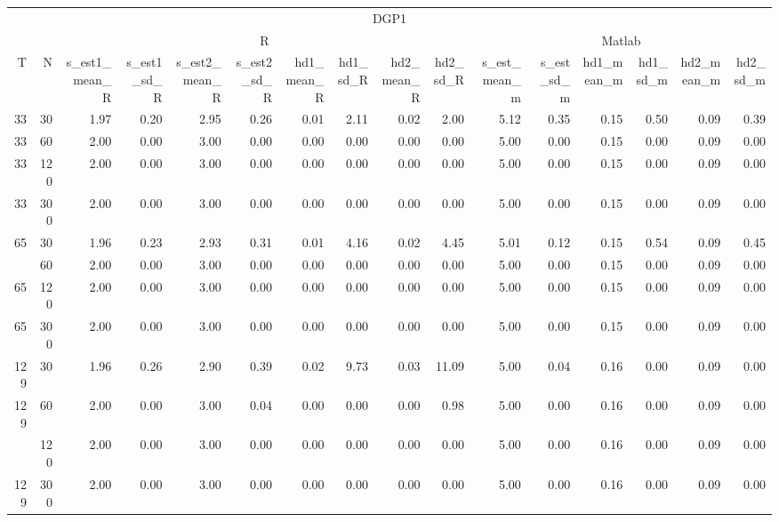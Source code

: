 
\begin{tabular}{rrrrrrrrrrrrrrrr}
\toprule
\multicolumn{16}{c}{DGP1} \\
\cmidrule(l{3pt}r{3pt}){1-16}
\multicolumn{2}{c}{ } & \multicolumn{8}{c}{R} & \multicolumn{6}{c}{Matlab} \\
\cmidrule(l{3pt}r{3pt}){3-10} \cmidrule(l{3pt}r{3pt}){11-16}
T & N & s\_est1\_mean\_R & s\_est1\_sd\_R & s\_est2\_mean\_R & s\_est2\_sd\_R & hd1\_mean\_R & hd1\_sd\_R & hd2\_mean\_R & hd2\_sd\_R & s\_est\_mean\_m & s\_est\_sd\_m & hd1\_mean\_m & hd1\_sd\_m & hd2\_mean\_m & hd2\_sd\_m\\
\midrule
33 & 30 & 1.97 & 0.20 & 2.95 & 0.26 & 0.01 & 2.11 & 0.02 & 2.00 & 5.12 & 0.35 & 0.15 & 0.50 & 0.09 & 0.39\\
33 & 60 & 2.00 & 0.00 & 3.00 & 0.00 & 0.00 & 0.00 & 0.00 & 0.00 & 5.00 & 0.00 & 0.15 & 0.00 & 0.09 & 0.00\\
33 & 120 & 2.00 & 0.00 & 3.00 & 0.00 & 0.00 & 0.00 & 0.00 & 0.00 & 5.00 & 0.00 & 0.15 & 0.00 & 0.09 & 0.00\\
33 & 300 & 2.00 & 0.00 & 3.00 & 0.00 & 0.00 & 0.00 & 0.00 & 0.00 & 5.00 & 0.00 & 0.15 & 0.00 & 0.09 & 0.00\\
65 & 30 & 1.96 & 0.23 & 2.93 & 0.31 & 0.01 & 4.16 & 0.02 & 4.45 & 5.01 & 0.12 & 0.15 & 0.54 & 0.09 & 0.45\\
\addlinespace
65 & 60 & 2.00 & 0.00 & 3.00 & 0.00 & 0.00 & 0.00 & 0.00 & 0.00 & 5.00 & 0.00 & 0.15 & 0.00 & 0.09 & 0.00\\
65 & 120 & 2.00 & 0.00 & 3.00 & 0.00 & 0.00 & 0.00 & 0.00 & 0.00 & 5.00 & 0.00 & 0.15 & 0.00 & 0.09 & 0.00\\
65 & 300 & 2.00 & 0.00 & 3.00 & 0.00 & 0.00 & 0.00 & 0.00 & 0.00 & 5.00 & 0.00 & 0.15 & 0.00 & 0.09 & 0.00\\
129 & 30 & 1.96 & 0.26 & 2.90 & 0.39 & 0.02 & 9.73 & 0.03 & 11.09 & 5.00 & 0.04 & 0.16 & 0.00 & 0.09 & 0.00\\
129 & 60 & 2.00 & 0.00 & 3.00 & 0.04 & 0.00 & 0.00 & 0.00 & 0.98 & 5.00 & 0.00 & 0.16 & 0.00 & 0.09 & 0.00\\
\addlinespace
129 & 120 & 2.00 & 0.00 & 3.00 & 0.00 & 0.00 & 0.00 & 0.00 & 0.00 & 5.00 & 0.00 & 0.16 & 0.00 & 0.09 & 0.00\\
129 & 300 & 2.00 & 0.00 & 3.00 & 0.00 & 0.00 & 0.00 & 0.00 & 0.00 & 5.00 & 0.00 & 0.16 & 0.00 & 0.09 & 0.00\\
\bottomrule
\end{tabular}

